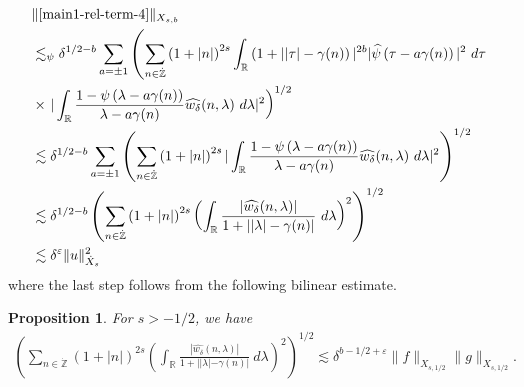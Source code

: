 \documentclass[12pt,reqno]{amsart}
\numberwithin{equation}{section}  %
\renewcommand{\cref}{\Cref}
\newcommand{\rr}{\mathbb{R}}
\newcommand{\zz}{\mathbb{Z}}
\newcommand{\zzdot}{\dot{\zz}}
\newcommand{\wh}{\widehat}
\newcommand{\ee}{\varepsilon}
\newtheorem{proposition}[theorem]{Proposition}
\begin{document}
\begin{equation}
\label{iu}
\begin{split}
& \| \cref{main1-rel-term-4} \|_{X_{s,b}} 
\\
& \lesssim_{\psi} \delta^{1/2 - b}
\sum_{a = \pm 1} \left( \sum_{n \in \zzdot} \left (1 + |n| \right)^{2s}
\int_\rr \left( 1 + | |\tau| - \gamma(n) \right ) |^{2b} | \wh{\psi}\left(
\tau - a\gamma(n) \right) |^2 \ d \tau \right.
\\
& \times \left . |
\int_\rr \frac{1 - \psi\left( \lambda - a\gamma(n) \right)}{\lambda -
a\gamma(n)} \wh{w_{\delta}}(n, \lambda) \ d \lambda |^2  \right)^{1/2}
\\
& \lesssim \delta^{1/2 - b}
\sum_{a = \pm 1}\left( \sum_{n \in \zzdot} \left (1 + |n| \right )^{2s} | \int_\rr
\frac{1 - \psi\left( \lambda - a\gamma(n) \right)}{\lambda - a\gamma(n)}
\wh{w_{\delta}}(n, \lambda) \ d\lambda |^2 \right)^{1/2}
\\
& \lesssim \delta^{1/2 - b}  \left( \sum_{n \in \zzdot} \left (1 + |n| \right )^{2s}  \left ( \int_\rr
\frac{|\wh{w_{\delta}}(n, \lambda)|}{1 + | |\lambda| - \gamma(n)|}
\ d\lambda \right )^2 \right)^{1/2}
\\
& \lesssim \delta^{\ee} \| u \|_{\dot{X}_{s}}^{2}
\end{split}
\end{equation}
where the last step follows from the following bilinear estimate.
\begin{proposition}
For $s > -1/2$, we have
\begin{gather*}
\left( \sum_{n \in \zzdot} \left (1 + |n| \right )^{2s}  \left ( \int_\rr
\frac{|\wh{w_{\delta}}(n, \lambda)|}{1 + | |\lambda| - \gamma(n)|}
\ d\lambda \right )^2 \right)^{1/2} \lesssim \delta^{b-1/2 + \ee} \| f \|_{X_{s, 1/2}} \| g \|_{X_{s,1/2}}.
\end{gather*}
\label{prop:bilin-endpoint}
\end{proposition}
\end{document}
